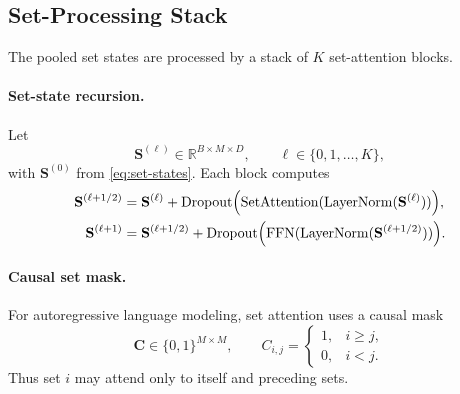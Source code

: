\documentclass{article}
\theoremstyle{plain}
\theoremstyle{definition}
\theoremstyle{remark}
\begin{document}
\subsection{Set-Processing Stack}
\label{sec:set-processing}

The pooled set states are processed by a stack of $K$ set-attention blocks.

\paragraph{Set-state recursion.}
Let
\begin{equation}
\label{eq:set-state-levels}
\mathbf S^{(\ell)}\in\mathbb R^{B\times M\times D},
\qquad
\ell\in\{0,1,\dots,K\},
\end{equation}
with $\mathbf S^{(0)}$ from \eqref{eq:set-states}. Each block computes
\begin{align}
\label{eq:block-attention}
\mathbf S^{(\ell+1/2)} &= \mathbf S^{(\ell)} + \operatorname{Dropout}\Bigl(\operatorname{SetAttention}(\operatorname{LayerNorm}(\mathbf S^{(\ell)}))\Bigr),\\
\label{eq:block-ffn}
\mathbf S^{(\ell+1)} &= \mathbf S^{(\ell+1/2)} + \operatorname{Dropout}\Bigl(\operatorname{FFN}(\operatorname{LayerNorm}(\mathbf S^{(\ell+1/2)}))\Bigr).
\end{align}

\paragraph{Causal set mask.}
For autoregressive language modeling, set attention uses a causal mask
\begin{equation}
\label{eq:causal-mask}
\mathbf C\in\{0,1\}^{M\times M},
\qquad
C_{i,j}=
\begin{cases}
1,& i\ge j,\\
0,& i<j.
\end{cases}
\end{equation}
Thus set $i$ may attend only to itself and preceding sets.
\end{document}
